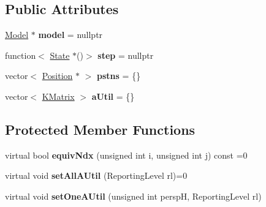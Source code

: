\subsection*{Public Attributes}
\begin{DoxyCompactItemize}
\item 
\hypertarget{class_k_base_1_1_state_a026ba4c3e63a9f7e574f748a43e40161}{\hyperlink{class_k_base_1_1_model}{Model} $\ast$ {\bfseries model} = nullptr}\label{class_k_base_1_1_state_a026ba4c3e63a9f7e574f748a43e40161}

\item 
\hypertarget{class_k_base_1_1_state_a37dd53c90270aceee8c0b873994d1ac7}{function$<$ \hyperlink{class_k_base_1_1_state}{State} $\ast$()$>$ {\bfseries step} = nullptr}\label{class_k_base_1_1_state_a37dd53c90270aceee8c0b873994d1ac7}

\item 
\hypertarget{class_k_base_1_1_state_a574d781488537e4aee8499cb0d31dcfc}{vector$<$ \hyperlink{class_k_base_1_1_position}{Position} $\ast$ $>$ {\bfseries pstns} = \{\}}\label{class_k_base_1_1_state_a574d781488537e4aee8499cb0d31dcfc}

\item 
\hypertarget{class_k_base_1_1_state_a99361c58b6e1351fd621cf16be4d7bb7}{vector$<$ \hyperlink{class_k_base_1_1_k_matrix}{K\-Matrix} $>$ {\bfseries a\-Util} = \{\}}\label{class_k_base_1_1_state_a99361c58b6e1351fd621cf16be4d7bb7}

\end{DoxyCompactItemize}
\subsection*{Protected Member Functions}
\begin{DoxyCompactItemize}
\item 
\hypertarget{class_k_base_1_1_state_a28b1863bc2f9c58e4b83ac33abbb0632}{virtual bool {\bfseries equiv\-Ndx} (unsigned int i, unsigned int j) const =0}\label{class_k_base_1_1_state_a28b1863bc2f9c58e4b83ac33abbb0632}

\item 
\hypertarget{class_k_base_1_1_state_a914af3a6cef478619b59eadb24e00d3c}{virtual void {\bfseries set\-All\-A\-Util} (Reporting\-Level rl)=0}\label{class_k_base_1_1_state_a914af3a6cef478619b59eadb24e00d3c}

\item 
\hypertarget{class_k_base_1_1_state_a5e498c150c69d964de4984c61c41439f}{virtual void {\bfseries set\-One\-A\-Util} (unsigned int persp\-H, Reporting\-Level rl)}\label{class_k_base_1_1_state_a5e498c150c69d964de4984c61c41439f}

\end{DoxyCompactItemize}
